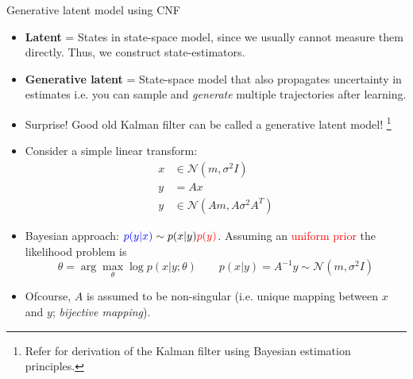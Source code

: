 \documentclass[dvipsnames, 9pt]{beamer}
\begin{document}
\begin{frame}{Generative latent model using CNF}
    \begin{itemize}
        \item \textbf{Latent} = States in state-space model, since we usually cannot measure
        them directly. Thus, we construct state-estimators.
        \item \textbf{Generative latent} = State-space model that also propagates uncertainty
        in estimates i.e. you can sample and \textit{generate} multiple trajectories after learning.
        \item Surprise! Good old Kalman filter can be called a generative latent model!
        \footnote{Refer \cite{rawlings:mayne:diehl:2020} for derivation of the Kalman filter using
        Bayesian estimation principles.}
        \item Consider a simple linear transform:
        \begin{align*}
            x &\in \mathcal{N}(m, \sigma^2 I) \\
            y &= Ax \\
            y &\in \mathcal{N}(Am, A\sigma^2 A^T)
        \end{align*}
        \item Bayesian approach: $\textcolor{blue}{p(y|x)} \sim p(x|y) \textcolor{red}{p(y)}$.
        Assuming an \textcolor{red}{uniform prior} the likelihood problem is 
        \[
        \theta = \arg\max\limits_{\theta} \log p(x|y; \theta) \qquad p(x|y) = A^{-1} y \sim \mathcal{N}(m, \sigma^2I)        \]
        \item Ofcourse, $A$ is assumed to be non-singular (i.e. unique mapping between $x$ and $y$;
        \textit{bijective mapping}).
    \end{itemize}
\end{frame}
\end{document}
